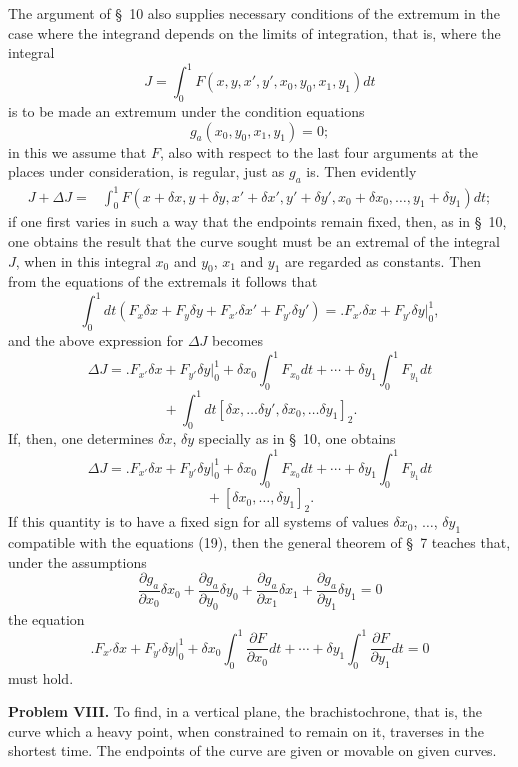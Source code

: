 \documentclass[11pt,a4paper,leqno]{article}
\begin{document}
The argument of \S~10 also supplies necessary conditions of the extremum in the case where the integrand depends on the limits of integration, that is, where the integral
\[
J=\int_0^1 F(x,y,x',y',x_0,y_0,x_1,y_1)dt
\]
is to be made an extremum under the condition equations
\begin{equation}\tag{19}
g_a(x_0,y_0,x_1,y_1)=0;
\end{equation}
in this we assume that $F$, also with respect to the last four arguments at the places under consideration, is regular, just as $g_a$ is. Then evidently
\[
\begin{split}
J+\Delta J
={}&\int_0^1 F(x+\delta x,y+\delta y,x'+\delta x',y'+\delta y',x_0+\delta x_0,\ldots,y_1+\delta y_1)dt;
\end{split}
\]
if one first varies in such a way that the endpoints remain fixed, then, as in \S~10, one obtains the result that the curve sought must be an extremal of the integral $J$, when in this integral $x_0$ and $y_0$, $x_1$ and $y_1$ are regarded as constants. Then from the equations of the extremals it follows that
\[
\int_0^1 dt(F_x\delta x+F_y\delta y+F_{x'}\delta x'+F_{y'}\delta y')=\bigl. F_{x'}\delta x+F_{y'}\delta y\bigr|_0^1,
\]
and the above expression for $\Delta J$ becomes
\[
\Delta J=\bigl. F_{x'}\delta x+F_{y'}\delta y\bigr|_0^1+\delta x_0\int_0^1 F_{x_0}dt+\cdots+\delta y_1\int_0^1 F_{y_1}dt
\]
\[
{}+\int_0^1dt[\delta x,\ldots \delta y',\delta x_0,\ldots \delta y_1]_2.
\]
If, then, one determines $\delta x$, $\delta y$ specially as in \S~10, one obtains
\[
\Delta J=\bigl. F_{x'}\delta x+F_{y'}\delta y\bigr|_0^1+\delta x_0\int_0^1 F_{x_0}dt+\cdots+\delta y_1\int_0^1 F_{y_1}dt
\]
\[
{}+[\delta x_0,\ldots,\delta y_1]_2.
\]
If this quantity is to have a fixed sign for all systems of values $\delta x_0$, $\ldots$, $\delta y_1$ compatible with the equations (19), then the general theorem of \S~7 teaches that, under the assumptions
\[
\frac{\partial g_a}{\partial x_0}\delta x_0+\frac{\partial g_a}{\partial y_0}\delta y_0+\frac{\partial g_a}{\partial x_1}\delta x_1+\frac{\partial g_a}{\partial y_1}\delta y_1=0
\]
the equation
\[
\bigl. F_{x'}\delta x+F_{y'}\delta y\bigr|_0^1+\delta x_0\int_0^1 \frac{\partial F}{\partial x_0}dt+\cdots+\delta y_1\int_0^1 \frac{\partial F}{\partial y_1}dt=0
\]
must hold.

\medskip
\noindent\textbf{Problem VIII.} To find, in a vertical plane, the brachistochrone, that is, the curve which a heavy point, when constrained to remain on it, traverses in the shortest time. The endpoints of the curve are given or movable on given curves.
\end{document}
